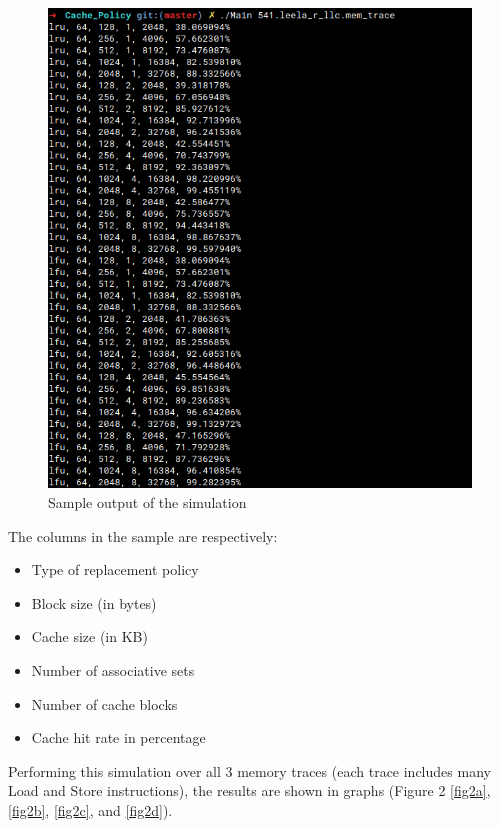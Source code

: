 \documentclass[letterpaper, 11pt]{article}
\begin{document}
	\begin{figure}[htb!]
		\centering
		\includegraphics[width=0.5\linewidth]{sample_program_output.png}
		\caption{Sample output of the simulation}
		\label{fig1}
	\end{figure}

	The columns in the sample are respectively:
		\begin{itemize}
			\item Type of replacement policy
			\item Block size (in bytes)
			\item Cache size (in KB)
			\item Number of associative sets 
			\item Number of cache blocks
			\item Cache hit rate in percentage
		\end{itemize}
	
	Performing this simulation over all 3 memory traces (each trace includes many Load and Store instructions), the results are shown in graphs (Figure 2 \ref{fig2a}, \ref{fig2b}, \ref{fig2c}, and \ref{fig2d}).
	
	\newpage
	
\end{document}
